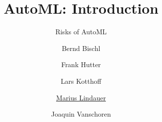 




\title[AutoML: Risks]{AutoML: Introduction}
\subtitle{Risks of AutoML}
\author[Marius Lindauer]{Bernd Bischl \and Frank Hutter \and Lars Kotthoff\newline \and \underline{Marius Lindauer} \and Joaquin Vanschoren}
\institute{}
\date{}





	
	\maketitle
	

